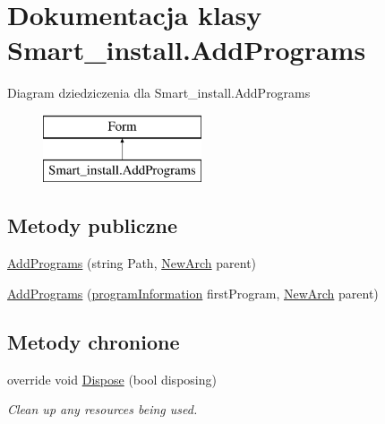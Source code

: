 \hypertarget{class_smart__install_1_1_add_programs}{\section{Dokumentacja klasy Smart\+\_\+install.\+Add\+Programs}
\label{class_smart__install_1_1_add_programs}
}
Diagram dziedziczenia dla Smart\+\_\+install.\+Add\+Programs\begin{figure}[H]
\begin{center}
\leavevmode
\includegraphics[height=2.000000cm]{class_smart__install_1_1_add_programs}
\end{center}
\end{figure}
\subsection*{Metody publiczne}
\begin{DoxyCompactItemize}
\item 
\hyperlink{class_smart__install_1_1_add_programs_a5dca12781a08d230249af4519626435d}{Add\+Programs} (string Path, \hyperlink{class_smart__install_1_1_new_arch}{New\+Arch} parent)
\item 
\hyperlink{class_smart__install_1_1_add_programs_aeb43ce91c812f52325913bc3ef697a31}{Add\+Programs} (\hyperlink{class_smart__install_1_1program_information}{program\+Information} first\+Program, \hyperlink{class_smart__install_1_1_new_arch}{New\+Arch} parent)
\end{DoxyCompactItemize}
\subsection*{Metody chronione}
\begin{DoxyCompactItemize}
\item 
override void \hyperlink{class_smart__install_1_1_add_programs_afd32b6bfead4212758a97864bf47e0d0}{Dispose} (bool disposing)
\begin{DoxyCompactList}\small\item\em Clean up any resources being used. \end{DoxyCompactList}\end{DoxyCompactItemize}


